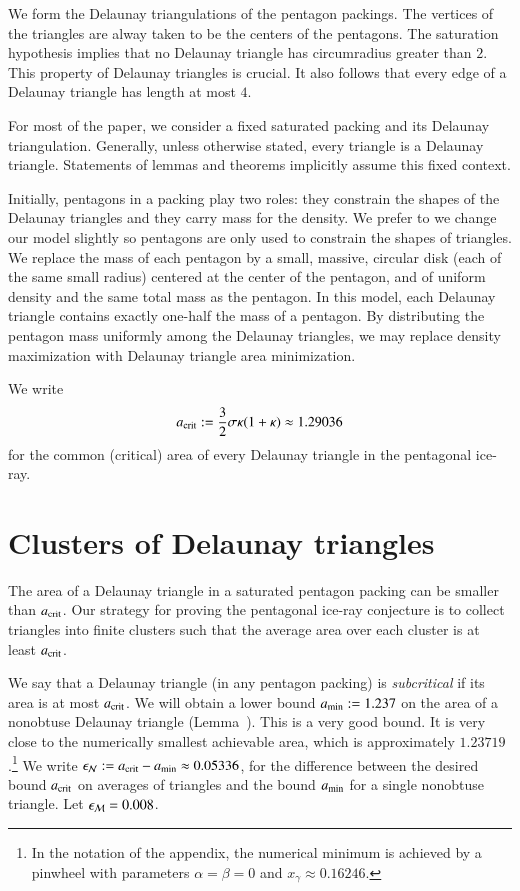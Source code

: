 We form the Delaunay triangulations of the pentagon packings.  The
vertices of the triangles are alway taken to be the centers of the
pentagons.  The saturation hypothesis implies that no Delaunay
triangle has circumradius greater than $2$.  This property of Delaunay
triangles is crucial.  It also follows that every edge of a Delaunay
triangle has length at most $4$.

For most of the paper, we consider a fixed saturated packing and its
Delaunay triangulation.  Generally, unless otherwise stated,
every triangle is a  Delaunay triangle.
Statements of lemmas and theorems implicitly
assume this fixed context.

Initially, pentagons in a packing play two roles: they constrain the
shapes of the Delaunay triangles and they carry mass for the density.
We prefer to we change our model slightly so pentagons are only used
to constrain the shapes of triangles.  We replace the mass of each
pentagon by a small, massive, circular disk (each of the same small
radius) centered at the center of the pentagon, and of uniform density
and the same total mass as the pentagon.  In this model, each Delaunay
triangle contains exactly one-half the mass of a pentagon.  By
distributing the pentagon mass uniformly among the Delaunay triangles,
we may replace density maximization with Delaunay triangle area
minimization.

We write 
\[
a_\text{crit} := \frac{3}{2}{ \sigma \kappa(1+\kappa)} \approx 1.29036
\] %
for the common (critical) area of every Delaunay triangle in the 
pentagonal ice-ray.

\section{Clusters of Delaunay triangles}

The area of a Delaunay triangle in a saturated pentagon packing can be
smaller than $a_\text{crit}$.  Our strategy for proving the pentagonal
ice-ray conjecture is to collect triangles into finite clusters such
that the average area over each cluster is at least $a_\text{crit}$.

We say that a Delaunay triangle (in any pentagon packing) is {\it
  subcritical} if its area is at most $a_\text{crit}$.  We will obtain a
lower bound $a_\text{min} := 1.237$ on the area of a nonobtuse Delaunay
triangle (Lemma~).  This is a very good bound.  It is
very close to the numerically smallest achievable area, which is
approximately $1.23719$.\footnote{In the notation of the appendix, the
  numerical minimum is achieved by a pinwheel with parameters
  $\alpha=\beta=0$ and $x_\gamma\approx 0.16246$.}  We write $\epsilon_{\mathcal N} :=
a_\text{crit} - a_\text{min} \approx 0.05336$, for the difference between the desired
bound $a_\text{crit}$ on averages of triangles and the bound $a_\text{min}$ for a
single nonobtuse triangle.  Let $\epsilon_{\mathcal M} = 0.008$.

